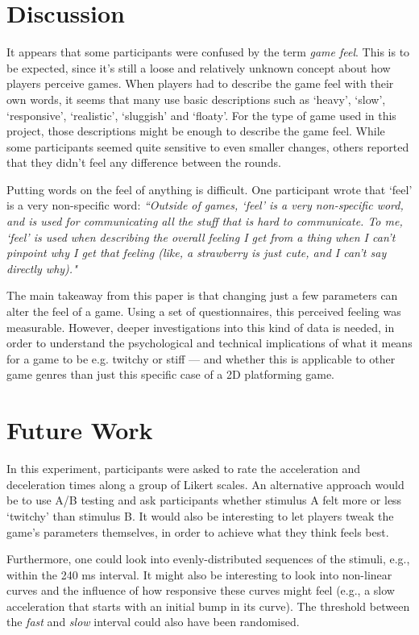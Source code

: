 \section{Discussion} \label{discussion}
It appears that some participants were confused by the term \textit{game feel}. This is to be expected, since it's still a loose and relatively unknown concept about how players perceive games. When players had to describe the game feel with their own words, it seems that many use basic descriptions such as `heavy', `slow', `responsive', `realistic', `sluggish' and `floaty'. For the type of game used in this project, those descriptions might be enough to describe the game feel. While some participants seemed quite sensitive to even smaller changes, others reported that they didn't feel any difference between the rounds.

Putting words on the feel of anything is difficult. One participant wrote that `feel' is a very non-specific word: \textit{``Outside of games, `feel' is a very non-specific word, and is used for communicating all the stuff that is hard to communicate. To me, `feel' is used when describing the overall feeling I get from a thing when I can't pinpoint why I get that feeling (like, a strawberry is just cute, and I can't say directly why)."}

The main takeaway from this paper is that changing just a few parameters can alter the feel of a game. Using a set of questionnaires, this perceived feeling was measurable. However, deeper investigations into this kind of data is needed, in order to understand the psychological and technical implications of what it means for a game to be e.g. twitchy or stiff --- and whether this is applicable to other game genres than just this specific case of a 2D platforming game.

\section{Future Work}
In this experiment, participants were asked to rate the acceleration and deceleration times along a group of Likert scales. An alternative approach would be to use A/B testing and ask participants whether stimulus A felt more or less `twitchy' than stimulus B. It would also be interesting to let players tweak the game's parameters themselves, in order to achieve what they think feels best.

Furthermore, one could look into evenly-distributed sequences of the stimuli, e.g., within the 240 ms interval. It might also be interesting to look into non-linear curves and the influence of how responsive these curves might feel (e.g., a slow acceleration that starts with an initial bump in its curve). The threshold between the \textit{fast} and \textit{slow} interval could also have been randomised.

